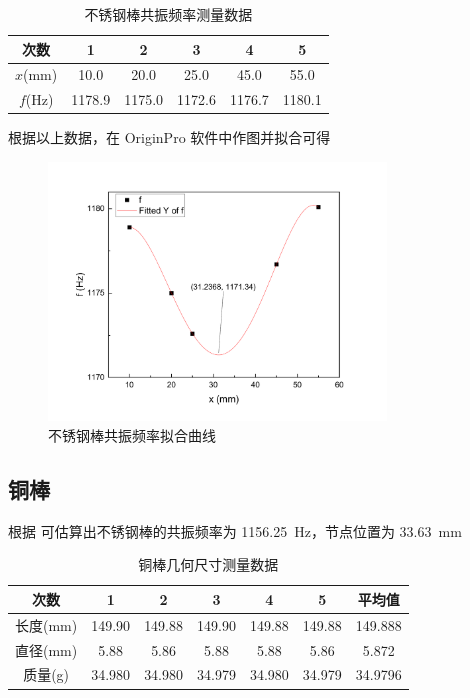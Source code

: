 \begin{table}[!ht]
    \caption{不锈钢棒共振频率测量数据}\label{tab:A5.steelFreq}
    \begin{tabular}{c *{5}{S[table-format=4.1]}} \toprule
        次数 & {1} & {2} & {3} & {4} & {5} \\ \midrule
        $x$(\unit{\mm}) & 10.0 & 20.0 & 25.0 & 45.0 & 55.0 \\ 
        $f$(\unit{\Hz}) & 1178.9 & 1175.0 & 1172.6 & 1176.7 & 1180.1 \\\bottomrule
    \end{tabular}
\end{table}
根据以上数据，在 OriginPro 软件中作图并拟合可得
\begin{figure}[!ht]
    \caption{不锈钢棒共振频率拟合曲线}
    \includegraphics[width=0.8\textwidth]{img/A5/steelFreq.pdf}
\end{figure}

\subsection{铜棒}
根据 可估算出不锈钢棒的共振频率为 \SI{1156.25}{\Hz}，节点位置为 \SI{33.63}{\mm}
\begin{table}[!ht]
    \caption{铜棒几何尺寸测量数据}\label{tab:A5.copperSize}
    \begin{tabular}{c *{5}{S[table-format=3.3]} S[table-format=3.4]} \toprule
        次数 & {1} & {2} & {3} & {4} & {5} & {平均值} \\ \midrule
        长度(\unit{\mm}) & 149.90 & 149.88 & 149.90 & 149.88 & 149.88 & 149.888 \\ 
        直径(\unit{\mm}) & 5.88 & 5.86 & 5.88 & 5.88 & 5.86 & 5.872 \\ 
        质量(\unit{\g}) & 34.980 & 34.980 & 34.979 & 34.980 & 34.979 & 34.9796 \\ \bottomrule
    \end{tabular}
\end{table}

